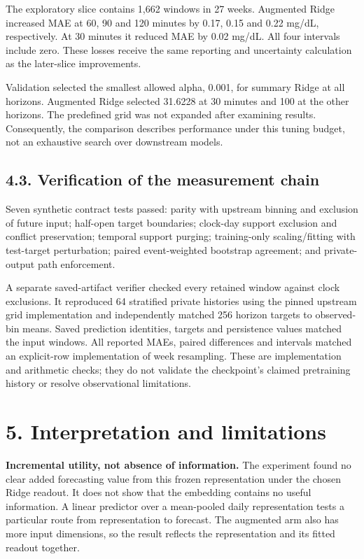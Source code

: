 \documentclass[11pt,letterpaper]{article}
\begin{document}
The exploratory slice contains 1,662 windows in 27 weeks. Augmented
Ridge increased MAE at 60, 90 and 120 minutes by 0.17, 0.15 and 0.22
mg/dL, respectively. At 30 minutes it reduced MAE by 0.02 mg/dL. All
four intervals include zero. These losses receive the same reporting and
uncertainty calculation as the later-slice improvements.

Validation selected the smallest allowed alpha, 0.001, for summary Ridge
at all horizons. Augmented Ridge selected 31.6228 at 30 minutes and 100
at the other horizons. The predefined grid was not expanded after
examining results. Consequently, the comparison describes performance
under this tuning budget, not an exhaustive search over downstream
models.

\subsection{4.3. Verification of the measurement
chain}\label{verification-of-the-measurement-chain}

Seven synthetic contract tests passed: parity with upstream binning and
exclusion of future input; half-open target boundaries; clock-day
support exclusion and conflict preservation; temporal support purging;
training-only scaling/fitting with test-target perturbation; paired
event-weighted bootstrap agreement; and private-output path enforcement.

A separate saved-artifact verifier checked every retained window against
clock exclusions. It reproduced 64 stratified private histories using
the pinned upstream grid implementation and independently matched 256
horizon targets to observed-bin means. Saved prediction identities,
targets and persistence values matched the input windows. All reported
MAEs, paired differences and intervals matched an explicit-row
implementation of week resampling. These are implementation and
arithmetic checks; they do not validate the checkpoint's claimed
pretraining history or resolve observational limitations.

\section{5. Interpretation and
limitations}\label{interpretation-and-limitations}

\textbf{Incremental utility, not absence of information.} The experiment
found no clear added forecasting value from this frozen representation
under the chosen Ridge readout. It does not show that the embedding
contains no useful information. A linear predictor over a mean-pooled
daily representation tests a particular route from representation to
forecast. The augmented arm also has more input dimensions, so the
result reflects the representation and its fitted readout together.
\end{document}
